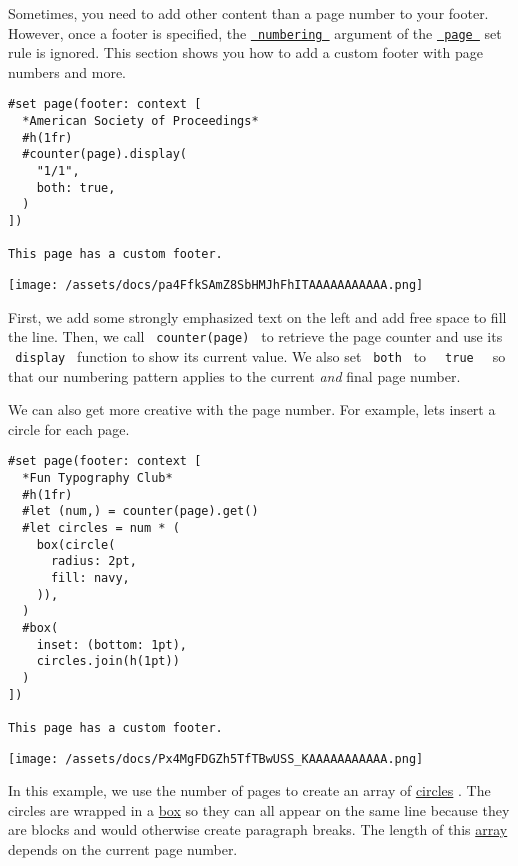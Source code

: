 Sometimes, you need to add other content than a page number to your
footer. However, once a footer is specified, the
\href{/docs/reference/layout/page/\#parameters-numbering}{\texttt{\ numbering\ }}
argument of the \href{/docs/reference/layout/page/}{\texttt{\ page\ }}
set rule is ignored. This section shows you how to add a custom footer
with page numbers and more.

\begin{verbatim}
#set page(footer: context [
  *American Society of Proceedings*
  #h(1fr)
  #counter(page).display(
    "1/1",
    both: true,
  )
])

This page has a custom footer.
\end{verbatim}

\texttt{[image: /assets/docs/pa4FfkSAmZ8SbHMJhFhITAAAAAAAAAAA.png]}

First, we add some strongly emphasized text on the left and add free
space to fill the line. Then, we call \texttt{\ counter(page)\ } to
retrieve the page counter and use its \texttt{\ display\ } function to
show its current value. We also set \texttt{\ both\ } to
\texttt{\ }{\texttt{\ true\ }}\texttt{\ } so that our numbering pattern
applies to the current \emph{and} final page number.

We can also get more creative with the page number. For example,
let\textquotesingle s insert a circle for each page.

\begin{verbatim}
#set page(footer: context [
  *Fun Typography Club*
  #h(1fr)
  #let (num,) = counter(page).get()
  #let circles = num * (
    box(circle(
      radius: 2pt,
      fill: navy,
    )),
  )
  #box(
    inset: (bottom: 1pt),
    circles.join(h(1pt))
  )
])

This page has a custom footer.
\end{verbatim}

\texttt{[image: /assets/docs/Px4MgFDGZh5TfTBwUSS\_KAAAAAAAAAAA.png]}

In this example, we use the number of pages to create an array of
\href{/docs/reference/visualize/circle/}{circles} . The circles are
wrapped in a \href{/docs/reference/layout/box/}{box} so they can all
appear on the same line because they are blocks and would otherwise
create paragraph breaks. The length of this
\href{/docs/reference/foundations/array/}{array} depends on the current
page number.

